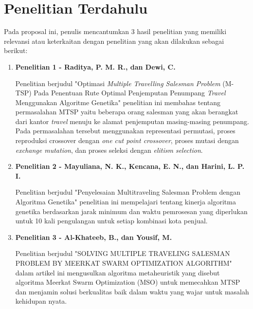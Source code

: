 \section{Penelitian Terdahulu}

Pada proposal ini, penulis mencantumkan 3 hasil penelitian yang memiliki relevansi atau keterkaitan dengan penelitian yang akan dilakukan sebagai berikut:

\begin{enumerate}
	\item \textbf{Penelitian 1 - Raditya, P. M. R., dan Dewi, C.} \cite{raditya2017optimasi}

Penelitian berjudul "Optimasi \textit{Multiple Travelling Salesman Problem} (M-TSP) Pada Penentuan Rute Optimal Penjemputan Penumpang \textit{Travel} Menggunakan Algoritme Genetika" penelitian ini membahas tentang permasalahan MTSP yaitu beberapa orang salesman yang akan berangkat dari kantor \textit{travel} menuju ke alamat penjemputan masing-masing penumpang. Pada permasalahan tersebut menggunakan representasi permutasi, proses reproduksi crossover dengan \textit{one cut point crossover}, proses mutasi dengan \textit{exchange mutation}, dan proses seleksi dengan \textit{elitism selection}.

	\item \textbf{Penelitian 2 - Mayuliana, N. K., Kencana, E. N., dan Harini, L. P. I.} \cite{mayuliana2015penyelesaian}

Penelitian berjudul "Penyelesaian Multitraveling Salesman Problem dengan Algoritma Genetika" penelitian ini mempelajari tentang kinerja algoritma genetika berdasarkan jarak minimum dan waktu pemrosesan yang diperlukan untuk 10 kali pengulangan untuk setiap kombinasi kota penjual.

	\item \textbf{Penelitian 3 - Al-Khateeb, B., dan Yousif, M.} \cite{al2019solving}

Penelitian berjudul "SOLVING MULTIPLE TRAVELING SALESMAN PROBLEM BY MEERKAT SWARM OPTIMIZATION ALGORITHM" dalam artikel ini mengusulkan algoritma metaheuristik yang disebut algoritma Meerkat Swarm Optimization (MSO) untuk memecahkan MTSP dan menjamin solusi berkualitas baik dalam waktu yang wajar untuk masalah kehidupan nyata.

\end{enumerate}



